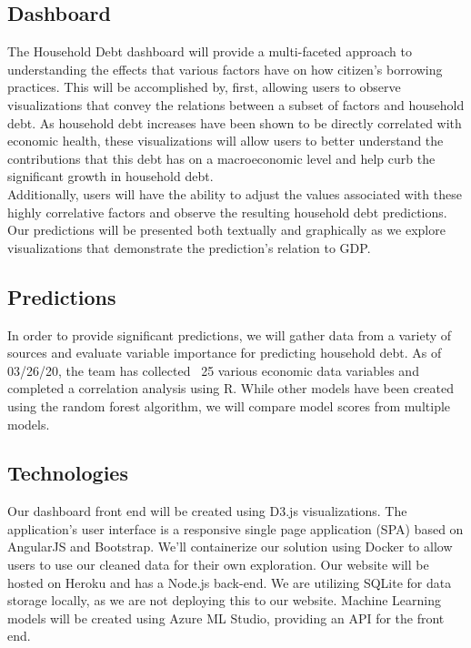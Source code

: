 \documentclass[sigconf,nonacm,11pt]{acmart}
\begin{document}
\subsection{Dashboard}
The Household Debt dashboard will provide a multi-faceted approach to understanding the effects that various factors have on how citizen's borrowing practices.  This will be accomplished by, first, allowing users to observe visualizations that convey the relations between a subset of factors and household debt.  As household debt increases have been shown to be directly correlated with economic health\cite{Mian2015}, these visualizations will allow users to better understand the contributions that this debt has on a macroeconomic level and help curb the significant growth in household debt\cite{Alter2018}.\\
Additionally, users will have the ability to adjust the values associated with these highly correlative factors and observe the resulting household debt predictions.  Our predictions will be presented both textually and graphically as we explore visualizations that demonstrate the prediction's relation to GDP.\vspace{-0.5em}

\subsection{Predictions}

In order to provide significant predictions, we will gather data from a variety of sources and evaluate variable importance for predicting household debt. As of 03/26/20, the team has collected ~25 various economic data variables and completed a correlation analysis using R.  While other models have been created using the random forest algorithm\cite{Nyman2018}, we will compare model scores from multiple models.\vspace{-0.5em}

\subsection{Technologies}

Our dashboard front end will be created using D3.js visualizations. The application's user interface is a responsive single page application (SPA) based on AngularJS and Bootstrap. We'll containerize our solution using Docker to allow users to use our cleaned data for their own exploration. Our website will be hosted on Heroku and has a Node.js back-end. We are utilizing SQLite for data storage locally, as we are not deploying this to our website. Machine Learning models will be created using Azure ML Studio, providing an API for the front end. \vspace{-0.5em}
\end{document}
